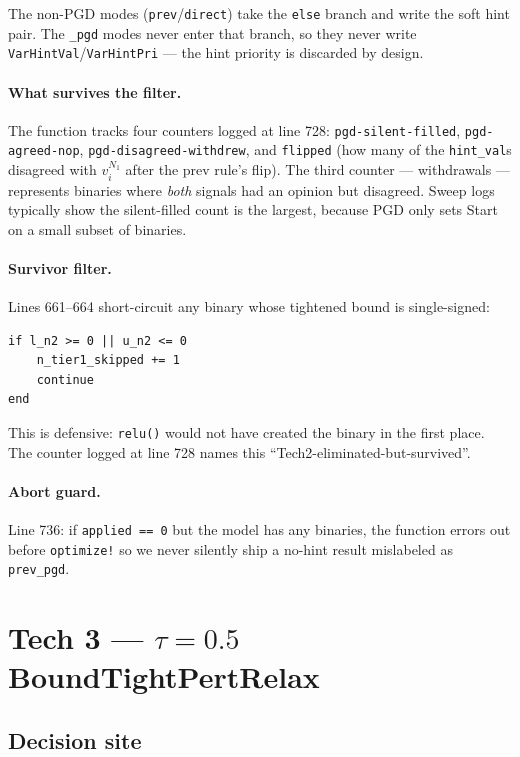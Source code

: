 \documentclass[11pt]{article}
\newcommand{\src}[1]{\texttt{\small #1}}
\begin{document}
The non-PGD modes (\texttt{prev}/\texttt{direct}) take the
\texttt{else} branch and write the soft hint pair. The \texttt{\_pgd}
modes never enter that branch, so they never write
\texttt{VarHintVal}/\texttt{VarHintPri} --- the hint priority is
discarded by design.

\paragraph{What survives the filter.}
The function tracks four counters logged at line 728:
\src{pgd-silent-filled}, \src{pgd-agreed-nop},
\src{pgd-disagreed-withdrew}, and \src{flipped} (how many of the
\src{hint\_val}s disagreed with $v^{N_1}_i$ after the prev rule's
flip). The third counter --- withdrawals --- represents binaries
where \emph{both} signals had an opinion but disagreed. Sweep logs
typically show the silent-filled count is the largest, because PGD
only sets Start on a small subset of binaries.

\paragraph{Survivor filter.}
Lines 661--664 short-circuit any binary whose tightened bound is
single-signed:
\begin{lstlisting}[style=jl]
if l_n2 >= 0 || u_n2 <= 0
    n_tier1_skipped += 1
    continue
end
\end{lstlisting}
This is defensive: \src{relu()} would not have created the binary
in the first place. The counter logged at line 728 names this
``Tech2-eliminated-but-survived''.

\paragraph{Abort guard.}
Line 736: if \src{applied == 0} but the model has any binaries, the
function errors out before \src{optimize!} so we never silently ship
a no-hint result mislabeled as \texttt{prev\_pgd}.

\section{Tech 3 --- $\tau=0.5$ BoundTightPertRelax}
\label{sec:tau}

\subsection{Decision site}
\end{document}
